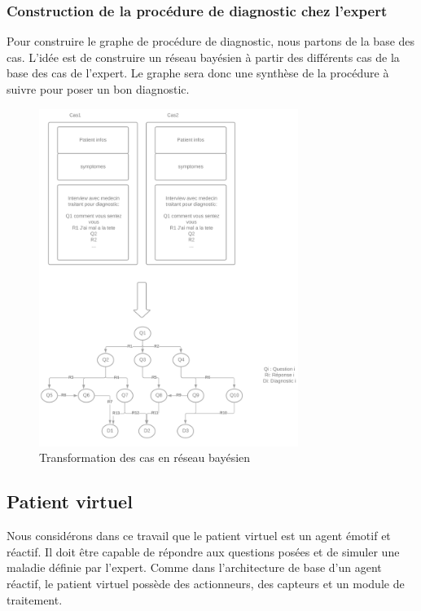     \subsubsection{Construction de la procédure de diagnostic chez l'expert}
    Pour construire le graphe de procédure de diagnostic, nous partons de la base des cas. L'idée est de construire un réseau bayésien à partir des différents cas de la base des cas de l'expert.
    Le graphe sera donc une synthèse de la procédure à suivre pour poser un bon diagnostic.
    
    
    \begin{figure}[H]
        \centering
        \includegraphics[width=0.75\textwidth]{figures/Trans base cas-reseau bayesien.png}
        \captionsetup{justification=centering}
        \caption{Transformation des cas en réseau bayésien}
        \label{fig:4}
    \end{figure}
    
    \subsection{Patient virtuel}
    Nous considérons dans ce travail que le patient virtuel est un agent émotif et réactif. Il doit être capable de répondre aux questions posées et de simuler une maladie définie par l'expert.
    Comme dans l'architecture de base d'un agent réactif, le patient virtuel possède des actionneurs, des capteurs et un module de traitement.
    
